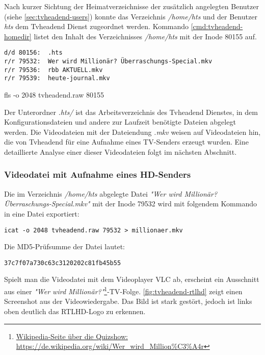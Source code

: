 Nach kurzer Sichtung der Heimatverzeichnisse der zusätzlich angelegten Benutzer (siehe \autoref{sec:tvheadend-users}) konnte das Verzeichnis \textit{/home/hts} und der Benutzer \textit{hts} dem Tvheadend Dienst zugeordnet werden. Kommando \autoref{cmd:tvheadend-homedir} listet den Inhalt des Verzeichnisses \textit{/home/hts} mit der Inode 80155 auf.

\begin{cmd}[H]
\begin{verbatim}
d/d 80156:	.hts
r/r 79532:	Wer wird Millionär? Überraschungs-Special.mkv
r/r 79536:	rbb AKTUELL.mkv
r/r 79539:	heute-journal.mkv
\end{verbatim}
\caption{fls -o 2048 tvheadend.raw 80155}
\label{cmd:tvheadend-homedir}
\end{cmd}

Der Unterordner \textit{.hts/} ist das Arbeitsverzeichnis des Tvheadend Dienstes, in dem Konfigurationsdateien und andere zur Laufzeit benötigte Dateien abgelegt werden. Die Videodateien mit der Dateiendung \textit{.mkv} weisen auf Videodateien hin, die von Tvheadend für eine Aufnahme eines TV-Senders erzeugt wurden. Eine detaillierte Analyse einer dieser Videodateien folgt im nächsten Abschnitt.

\subsubsection{Videodatei mit Aufnahme eines HD-Senders}
\label{sec:tvheadend-rtlhd}

Die im Verzeichnis \textit{/home/hts} abgelegte Datei \textit{"Wer wird Millionär? Überraschungs-Special.mkv"} mit der Inode 79532 wird mit folgendem Kommando in eine Datei exportiert:

\begin{verbatim}
icat -o 2048 tvheadend.raw 79532 > millionaer.mkv
\end{verbatim}

Die MD5-Prüfsumme der Datei lautet:

\begin{verbatim}
37c7f07a730c63c3120202c81fb45b55
\end{verbatim}

Spielt man die Videodatei mit dem Videoplayer VLC ab, erscheint ein Ausschnitt aus einer \textit{"Wer wird 	Millionär?"}\footnote{\href{https://de.wikipedia.org/wiki/Wer\_wird\_Million\%C3\%A4r}{Wikipedia-Seite über die Quizshow: https://de.wikipedia.org/wiki/Wer\_wird\_Million\%C3\%A4r}}-TV-Folge. \autoref{fig:tvheadend-rtlhd} zeigt einen Screenshot aus der Videowiedergabe. Das Bild ist stark gestört, jedoch ist links oben deutlich das RTLHD-Logo zu erkennen.

